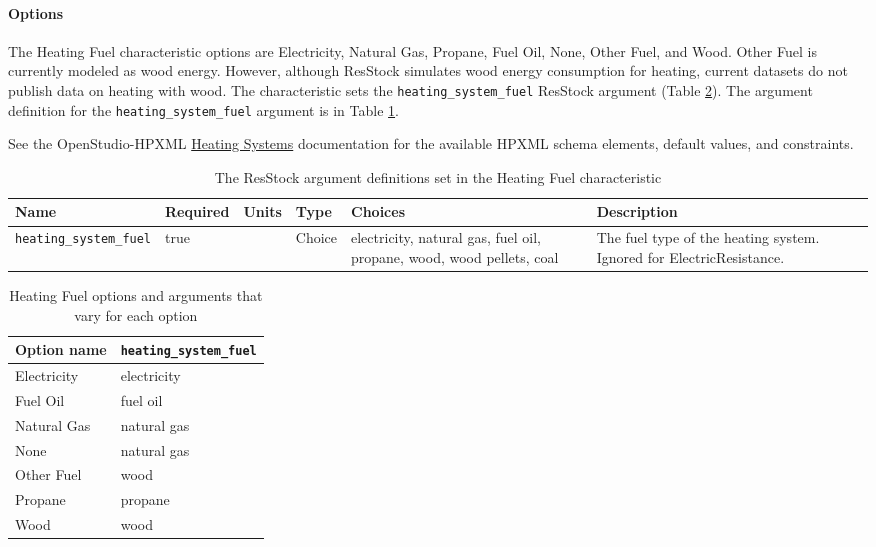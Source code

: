 \paragraph{Options}
The Heating Fuel characteristic options are Electricity, Natural Gas, Propane, Fuel Oil, None, Other Fuel, and Wood. Other Fuel is currently modeled as wood energy. However, although ResStock simulates wood energy consumption for heating, current datasets do not publish data on heating with wood. The characteristic sets the \texttt{heating\_system\_fuel} ResStock argument (Table \ref{table:hc_opt_hf}). The argument definition for the \texttt{heating\_system\_fuel} argument is in Table \ref{table:hc_arg_def_hf}.

See the OpenStudio-HPXML \href{https://openstudio-hpxml.readthedocs.io/en/v1.8.1/workflow_inputs.html#hpxml-heating-systems}{Heating Systems} documentation for the available HPXML schema elements, default values, and constraints.

\begin{longtable}[]{ |p{}|p{1.5cm}|p{1cm}|p{1.1cm}|p{2.4cm}|p{5cm}| }
\caption{The ResStock argument definitions set in the Heating Fuel characteristic} \label{table:hc_arg_def_hf} \\
\toprule\noalign{}
Name & Required & Units & Type & Choices & Description \\
\midrule\noalign{}
\endhead
\bottomrule\noalign{}
\endlastfoot
\texttt{heating\_system\_fuel} & true & & Choice & electricity, natural
gas, fuel oil, propane, wood, wood pellets, coal & The fuel type of the
heating system. Ignored for ElectricResistance. \\
\end{longtable}

\begin{longtable}[]{ |p{}|p{4cm}| }
\caption{Heating Fuel options and arguments that vary for each option} \label{table:hc_opt_hf} \\
\toprule\noalign{}
Option name & \texttt{heating\_system\_fuel} \\
\midrule\noalign{}
\endhead
\bottomrule\noalign{}
\endlastfoot
Electricity & electricity \\
Fuel Oil & fuel oil \\
Natural Gas & natural gas \\
None & natural gas \\
Other Fuel & wood \\
Propane & propane \\
Wood & wood \\
\end{longtable}

